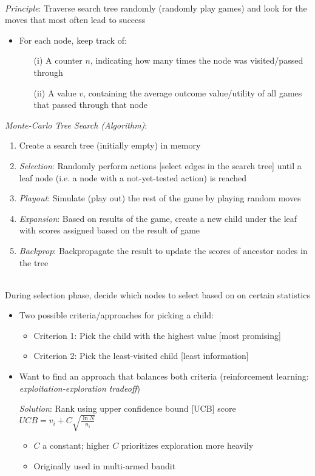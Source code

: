 \documentclass[12pt]{extarticle}
\theoremstyle{definition}
\theoremstyle{remark}
\newcommand{\pstart}[0]{\noindent}
\newcommand{\newp}[0]{~\\ \pstart}
\begin{document}
\newp
\textit{Principle}: Traverse search tree randomly (randomly play games) and look for the moves that most often lead to success \begin{itemize}
    \item For each node, keep track of: \begin{enumerate}
        \item[(i)] A counter $n$, indicating how many times the node was visited/passed through
        \item[(ii)] A value $v$, containing the average outcome value/utility of all games that passed through that node
    \end{enumerate}
\end{itemize}

\vspace{4pt}\pstart
\textit{Monte-Carlo Tree Search (Algorithm)}:\begin{enumerate}
    \item Create a search tree (initially empty) in memory
    \item \textit{Selection}: Randomly perform actions [select edges in the search tree] until a leaf node (i.e. a node with a not-yet-tested action) is reached
    \item \textit{Playout}: Simulate (play out) the rest of the game by playing random moves
    \item \textit{Expansion}: Based on results of the game, create a new child under the leaf with scores assigned based on the result of game
    \item \textit{Backprop}: Backpropagate the result to update the scores of ancestor nodes in the tree
\end{enumerate}

\newp
During selection phase, decide which nodes to select based on on certain statistics \begin{itemize}
    \item Two possible criteria/approaches for picking a child: \begin{itemize}
        \item Criterion 1: Pick the child with the highest value [most promising]
        \item Criterion 2: Pick the least-visited child [least information]
    \end{itemize}
    \item Want to find an approach that balances both criteria (reinforcement learning: \textit{exploitation-exploration tradeoff})

    \vspace{8pt}
    \textit{Solution}: Rank using {upper confidence bound} [UCB] score $UCB=v_i+C\sqrt{\frac{\ln{N}}{n_i}}$ \begin{itemize}
            \item $C$ a constant; higher $C$ prioritizes exploration more heavily
            \item Originally used in multi-armed bandit
        \end{itemize}
\end{itemize}
\end{document}
